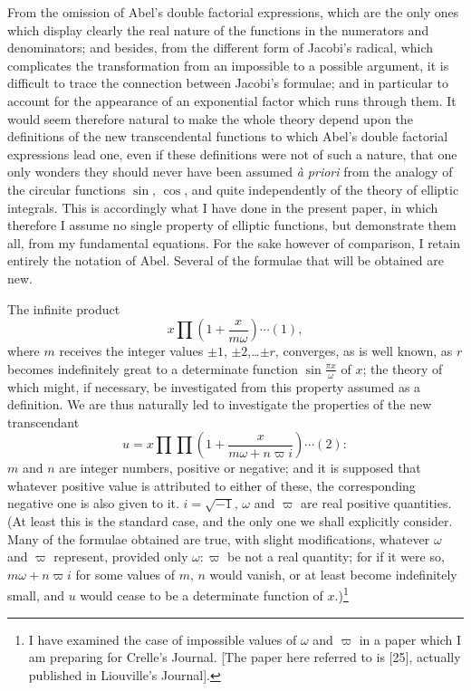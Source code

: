 \documentclass[12pt,a4paper]{article}
\begin{document}
From the omission of Abel's double factorial expressions, which are the only ones which display clearly the real nature of the functions in the numerators and denominators; and besides, from the different form of Jacobi's radical, which complicates the transformation from an impossible to a possible argument, it is difficult to trace the connection between Jacobi's formulae; and in particular to account for the appearance of an exponential factor which runs through them. It would seem therefore natural to make the whole theory depend upon the definitions of the new transcendental functions to which Abel's double factorial expressions lead one, even if these definitions were not of such a nature, that one only wonders they should never have been assumed \textit{\`a priori} from the analogy of the circular functions $\sin$, $\cos$, and quite independently of the theory of elliptic integrals. This is accordingly what I have done in the present paper, in which therefore I assume no single property of elliptic functions, but demonstrate them all, from my fundamental equations. For the sake however of comparison, I retain entirely the notation of Abel. Several of the formulae that will be obtained are new.

\medskip
The infinite product
\[
x\prod\left(1 + \frac{x}{m\omega}\right) \cdots(1),
\]
where $m$ receives the integer values $\pm1$, $\pm2$,\ldots $\pm r$, converges, as is well known, as $r$ becomes indefinitely great to a determinate function $\sin\frac{\pi x}{\omega}$ of $x$; the theory of which might, if necessary, be investigated from this property assumed as a definition. We are thus naturally led to investigate the properties of the new transcendant
\[
u = x\prod\prod\left(1 + \frac{x}{m\omega + n\varpi i}\right) \cdots(2):
\]
$m$ and $n$ are integer numbers, positive or negative; and it is supposed that whatever positive value is attributed to either of these, the corresponding negative one is also given to it. $i = \sqrt{-1}$, $\omega$ and $\varpi$ are real positive quantities. (At least this is the standard case, and the only one we shall explicitly consider. Many of the formulae obtained are true, with slight modifications, whatever $\omega$ and $\varpi$ represent, provided only $\omega : \varpi$ be not a real quantity; for if it were so, $m\omega + n\varpi i$ for some values of $m$, $n$ would vanish, or at least become indefinitely small, and $u$ would cease to be a determinate function of $x$.)\footnote{I have examined the case of impossible values of $\omega$ and $\varpi$ in a paper which I am preparing for Crelle's Journal. [The paper here referred to is [25], actually published in Liouville's Journal].}
\end{document}
